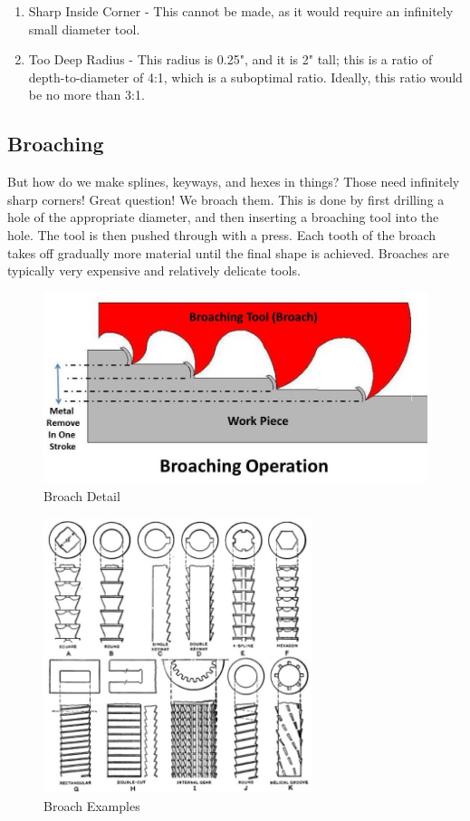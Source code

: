 \documentclass[10pt,letterpaper]{book}
\begin{document}
 \begin{enumerate}[label=\alph*]
 	\item Sharp Inside Corner - This cannot be made, as it would require an infinitely small diameter tool.
 	\item Too Deep Radius - This radius is 0.25", and it is 2" tall; this is a ratio of depth-to-diameter of 4:1, which is a suboptimal ratio. Ideally, this ratio would be no more than 3:1.
 \end{enumerate}
 
 \subsection{Broaching}
 
 But how do we make splines, keyways, and hexes in things? Those need infinitely sharp corners! Great question! We broach them. This is done by first drilling a hole of the appropriate diameter, and then inserting a broaching tool into the hole. The tool is then pushed through with a press. Each tooth of the broach takes off gradually more material until the final shape is achieved. Broaches are typically very expensive and relatively delicate tools.
 
 \begin{figure}[H] \centering
 	\includegraphics[width=\textwidth]{imgs/broach_detail.jpeg}
 	\caption{Broach Detail}
 \end{figure}
 
 \begin{figure}[H] \centering
 	\includegraphics[width=0.7\textwidth]{imgs/broach_examples.jpeg}
 	\caption{Broach Examples}
 \end{figure}
 
\end{document}
